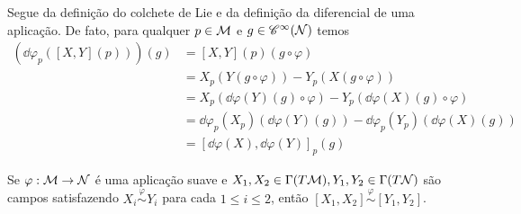 \begin{demm}
Segue da definição do colchete de Lie e da definição da diferencial de uma aplicação. De fato, para qualquer $p \in \mathcal{M}$ e $g \in \mathscr{C}^{\infty}(\mathcal{N})$ temos
\begin{align*}
\left( \dd \varphi_p\left([X, Y](p) \right) \right)(g) &= [X, Y](p) (g \circ \varphi) \\
&= X_p\left( Y(g \circ \varphi) \right) -  Y_p\left( X(g \circ \varphi) \right) \\
&= X_p \left( \dd \varphi(Y)(g) \circ \varphi \right) - Y_p \left( \dd \varphi(X)(g) \circ \varphi \right) \\ 
&= \dd \varphi_p(X_p)\left( \dd \varphi(Y)(g) \right) -  \dd \varphi_p(Y_p)\left( \dd \varphi(X)(g) \right) \\
&= [\dd \varphi (X), \dd \varphi(Y)]_p(g)
\end{align*}
\end{demm}

\begin{lema}\label{RelBrack}
Se $\varphi: \mathcal{M} \to \mathcal{N}$ é uma aplicação suave e $X_1, X_2 \in \Gamma(T \mathcal{M}), Y_1, Y_2 \in \Gamma(T \mathcal{N})$ são campos satisfazendo $X_i \stackrel{\varphi}{\sim} Y_i$ para cada $1 \leq i \leq 2$, então $[X_1, X_2] \stackrel{\varphi}{\sim} [Y_1, Y_2]$. 
\end{lema}

